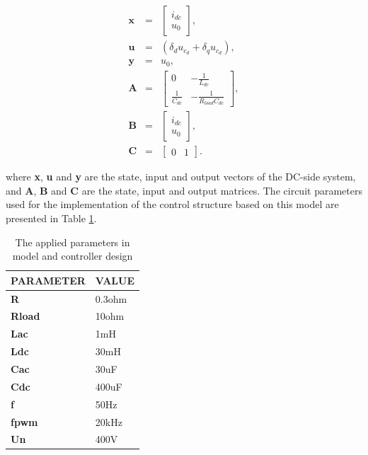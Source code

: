     \begin{equation}
        \begin{array}{rcl}
            \boldsymbol{x}&=&\begin{bmatrix}
                i_{dc}\\
                u_0
            \end{bmatrix},\\
            \boldsymbol{u}&=&(\delta_d u_{c_d}+\delta_q u_{c_d}),\\
            \boldsymbol{y}&=&u_0,\\
            \boldsymbol{A}&=&\begin{bmatrix}
                0&  -\frac{1}{L_{dc}}\\
                \frac{1}{C_{dc}}&   -\frac{1}{R_{load}C_{dc}}
            \end{bmatrix},\\
            \boldsymbol{B}&=&\begin{bmatrix}
                i_{dc}\\
                u_0
            \end{bmatrix},\\
            \boldsymbol{C}&=&\begin{bmatrix}0 &1\end{bmatrix}.
        \end{array}
        \label{EMPC:equ:mtx_ctrl}
    \end{equation}

    where \textbf{x}, \textbf{u} and \textbf{y} are the state, input and output vectors of the DC-side system, and \textbf{A}, \textbf{B} and \textbf{C} are the state, input and output matrices.
    The circuit parameters used for the implementation of the control structure based on this model are presented in Table \ref{EMPC:tbl:params}.

    \begin{table}[]
    \center
		\caption{The applied parameters in model and controller design}
        \begin{tabular}{|l|l|}
        \hline
        PARAMETER      & VALUE  \\ \hline
        \textbf{R}     & 0.3ohm \\ \hline
        \textbf{Rload} & 10ohm  \\ \hline
        \textbf{Lac}   & 1mH    \\ \hline
        \textbf{Ldc}   & 30mH   \\ \hline
        \textbf{Cac}   & 30uF   \\ \hline
        \textbf{Cdc}   & 400uF  \\ \hline
        \textbf{f}     & 50Hz   \\ \hline
        \textbf{fpwm}  & 20kHz  \\ \hline
        \textbf{Un}    & 400V   \\ \hline
        \end{tabular}
        \label{EMPC:tbl:params}
    \end{table}

